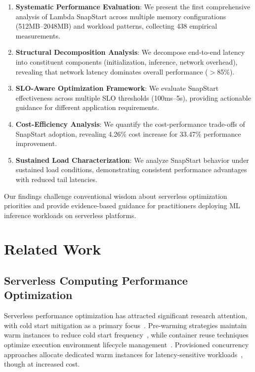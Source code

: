 \documentclass[conference]{IEEEtran}
\begin{document}
\begin{enumerate}
\item \textbf{Systematic Performance Evaluation}: We present the first comprehensive analysis of Lambda SnapStart across multiple memory configurations (512MB--2048MB) and workload patterns, collecting 438 empirical measurements.

\item \textbf{Structural Decomposition Analysis}: We decompose end-to-end latency into constituent components (initialization, inference, network overhead), revealing that network latency dominates overall performance (\(>\)85\%).

\item \textbf{SLO-Aware Optimization Framework}: We evaluate SnapStart effectiveness across multiple SLO thresholds (100ms--5s), providing actionable guidance for different application requirements.

\item \textbf{Cost-Efficiency Analysis}: We quantify the cost-performance trade-offs of SnapStart adoption, revealing 4.26\% cost increase for 33.47\% performance improvement.

\item \textbf{Sustained Load Characterization}: We analyze SnapStart behavior under sustained load conditions, demonstrating consistent performance advantages with reduced tail latencies.
\end{enumerate}

Our findings challenge conventional wisdom about serverless optimization priorities and provide evidence-based guidance for practitioners deploying ML inference workloads on serverless platforms.

\section{Related Work}

\subsection{Serverless Computing Performance Optimization}
Serverless performance optimization has attracted significant research attention, with cold start mitigation as a primary focus~\cite{serverless-performance-survey}. Pre-warming strategies maintain warm instances to reduce cold start frequency~\cite{prewarm-strategies}, while container reuse techniques optimize execution environment lifecycle management~\cite{container-reuse}. Provisioned concurrency approaches allocate dedicated warm instances for latency-sensitive workloads~\cite{provisioned-concurrency}, though at increased cost.
\end{document}

